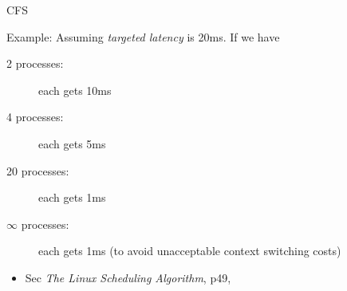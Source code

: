 \begin{frame}{CFS}
  \begin{block}{Example: }
    Assuming \emph{targeted latency} is 20ms. If we have
    \begin{description}
    \item[2 processes:] each gets 10ms
    \item[4 processes:] each gets 5ms
    \item[20 processes:] each gets 1ms
    \item[$\infty$ processes:] each gets 1ms (to avoid unacceptable context switching costs)
    \end{description}
  \end{block}
\end{frame}

\begin{itemize}
\item Sec \emph{The Linux Scheduling Algorithm}, p49, \cite{love2010linux}
\end{itemize}

  

